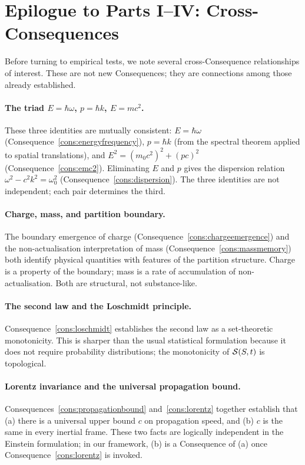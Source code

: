 \section*{Epilogue to Parts I--IV: Cross-Consequences}

Before turning to empirical tests, we note several cross-Consequence relationships of interest. These are not new Consequences; they are connections among those already established.

\paragraph{The triad $E=\hbar\omega$, $p=\hbar k$, $E=mc^{2}$.} These three identities are mutually consistent: $E=\hbar\omega$ (Consequence~\ref{cons:energyfrequency}), $p=\hbar k$ (from the spectral theorem applied to spatial translations), and $E^{2}=(m_{0}c^{2})^{2}+(pc)^{2}$ (Consequence~\ref{cons:emc2}). Eliminating $E$ and $p$ gives the dispersion relation $\omega^{2}-c^{2}k^{2}=\omega_{0}^{2}$ (Consequence~\ref{cons:dispersion}). The three identities are not independent; each pair determines the third.

\paragraph{Charge, mass, and partition boundary.} The boundary emergence of charge (Consequence~\ref{cons:chargeemergence}) and the non-actualisation interpretation of mass (Consequence~\ref{cons:massmemory}) both identify physical quantities with features of the partition structure. Charge is a property of the boundary; mass is a rate of accumulation of non-actualisation. Both are structural, not substance-like.

\paragraph{The second law and the Loschmidt principle.} Consequence~\ref{cons:loschmidt} establishes the second law as a set-theoretic monotonicity. This is sharper than the usual statistical formulation because it does not require probability distributions; the monotonicity of $\mathcal{S}(S,t)$ is topological.

\paragraph{Lorentz invariance and the universal propagation bound.} Consequences~\ref{cons:propagationbound} and~\ref{cons:lorentz} together establish that (a) there is a universal upper bound $c$ on propagation speed, and (b) $c$ is the same in every inertial frame. These two facts are logically independent in the Einstein formulation; in our framework, (b) is a Consequence of (a) once Consequence~\ref{cons:lorentz} is invoked.

